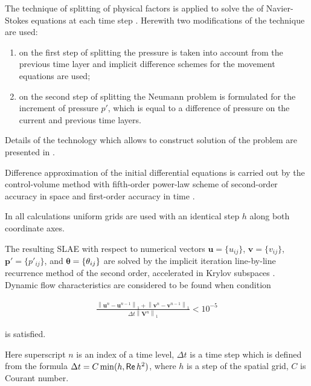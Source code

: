 The technique of splitting of physical factors is applied to solve the of Navier-Stokes equations at each time step \cite{BGSh}. Herewith two modifications of the technique are used: 

\begin{enumerate}

\item  on the first step of splitting  the pressure is taken into account from the previous time layer and implicit difference schemes for the movement equations are used; 

\item  on the second step of splitting the Neumann problem is formulated for the increment of pressure $p'$, which is equal to a difference of pressure on the current and previous time layers. 



\end{enumerate}

Details of the technology which allows to construct solution of the problem are presented in  \cite{Fomin2016}.   





Difference approximation of the initial differential equations is carried out by the control-volume method with fifth-order power-law scheme of second-order accuracy in space and first-order accuracy in time \cite{Patncr}. 

In all calculations uniform grids are used with an identical step $h$ along both coordinate axes. 

The resulting SLAE with respect to numerical vectors $\textbf{u} = \{u_{ij}\}$, $\textbf{v} = \{v_{ij}\}$, $\textbf{p}' = \{p'_{ij}\}$, and $\text{\usefont{U}{psy}{m}{n}q} = \{\theta_{ij}\}$ are solved by the implicit iteration line-by-line recurrence method of the second order, accelerated in Krylov subspaces \cite{Fomin2012}.  Dynamic flow characteristics are considered to be found when condition 



\begin{gather*}

   \frac{\left\|\textbf{u}^n-\textbf{u}^{n-1}\right\|_1+\left\|\textbf{v}^n-\textbf{v}^{n-1}\right\|_1}{\Delta t \left\|\textbf{V}^n\right\|_1}<10^{-5}

\end{gather*}

is satisfied. 

Here superscript $n$ is an index of a time level, $\Delta t$ is a time step which is defined from the formula $\Delta t=C \min(h,\mathop{\sf Re}h^2)$, where $h$ is a step of the spatial grid, $C$ is Courant number. 

